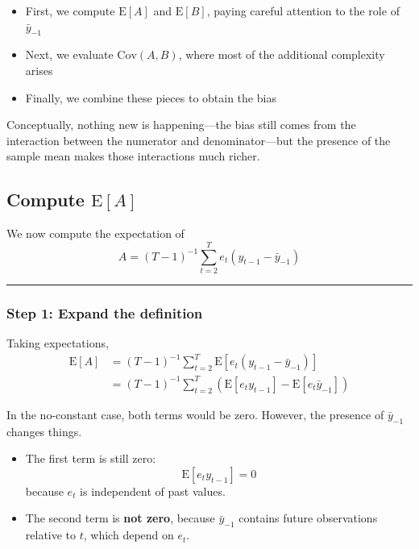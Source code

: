 \documentclass[11pt]{article}
\providecommand{\tightlist}{%
      \setlength{\itemsep}{0pt}\setlength{\parskip}{0pt}}
\begin{document}
\begin{itemize}
\tightlist
\item
  First, we compute \(\text{E}[A]\) and \(\text{E}[B]\), paying careful
  attention to the role of \(\bar y_{-1}\)
\item
  Next, we evaluate \(\text{Cov}(A,B)\), where most of the additional
  complexity arises
\item
  Finally, we combine these pieces to obtain the bias
\end{itemize}

Conceptually, nothing new is happening---the bias still comes from the
interaction between the numerator and denominator---but the presence of
the sample mean makes those interactions much richer.

    \subsection{\texorpdfstring{Compute
\(\text{E}[A]\)}{Compute \textbackslash text\{E\}{[}A{]}}}\label{compute-textea}

We now compute the expectation of \[
A = (T-1)^{-1}\sum_{t=2}^{T} e_t(y_{t-1}-\bar y_{-1})
\]

\begin{center}\rule{0.5\linewidth}{0.5pt}\end{center}

\subsubsection{Step 1: Expand the
definition}\label{step-1-expand-the-definition}

Taking expectations, \[
\begin{aligned}
\text{E}[A]
&= (T-1)^{-1}\sum_{t=2}^{T} \text{E}\left[e_t(y_{t-1}-\bar y_{-1})\right]\\
&= (T-1)^{-1}\sum_{t=2}^{T} \left(\text{E}[e_t y_{t-1}] - \text{E}[e_t \bar y_{-1}]\right)
\end{aligned}
\]

In the no-constant case, both terms would be zero. However, the presence
of \(\bar y_{-1}\) changes things.

\begin{itemize}
\item
  The first term is still zero: \[
  \text{E}[e_t y_{t-1}] = 0
  \] because \(e_t\) is independent of past values.
\item
  The second term is \textbf{not zero}, because \(\bar y_{-1}\) contains
  future observations relative to \(t\), which depend on \(e_t\).
\end{itemize}
\end{document}
